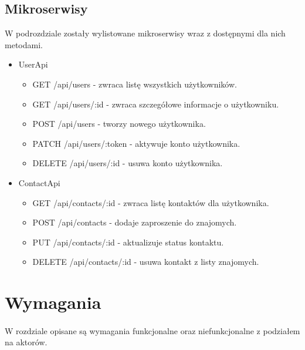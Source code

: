 \documentclass{article}
\begin{document}
  \subsection{Mikroserwisy}
  W podrozdziale zostały wylistowane mikroserwisy wraz z dostępnymi dla nich metodami.
  \begin{itemize}
    \item UserApi
    \begin{itemize}
      \item GET /api/users - zwraca listę wszystkich użytkowników.
      \item GET /api/users/:id - zwraca szczegółowe informacje o użytkowniku.
      \item POST /api/users - tworzy nowego użytkownika.
      \item PATCH /api/users/:token - aktywuje konto użytkownika.
      \item DELETE /api/users/:id - usuwa konto użytkownika.
    \end{itemize}
    \item ContactApi
    \begin{itemize}
      \item GET /api/contacts/:id - zwraca listę kontaktów dla użytkownika.
      \item POST /api/contacts - dodaje zaproszenie do znajomych.
      \item PUT /api/contacts/:id - aktualizuje status kontaktu.
      \item DELETE /api/contacts/:id - usuwa kontakt z listy znajomych.
    \end{itemize}
  \end{itemize}
  \section{Wymagania}
  \paragraph{} W rozdziale opisane są wymagania funkcjonalne oraz niefunkcjonalne z podziałem na aktorów.
\end{document}
